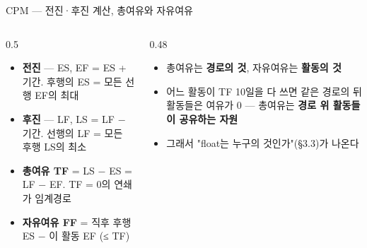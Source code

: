 \begin{frame}{CPM — 전진·후진 계산, 총여유와 자유여유}
\begin{columns}[T]
\begin{column}{0.5\textwidth}
\begin{itemize}
\item \textbf{전진} — ES, EF = ES + 기간. 후행의 ES = 모든 선행 EF의 최대
\item \textbf{후진} — LF, LS = LF $-$ 기간. 선행의 LF = 모든 후행 LS의 최소
\item \textbf{총여유 TF} = LS $-$ ES = LF $-$ EF. TF = 0의 연쇄가 임계경로
\item \textbf{자유여유 FF} = 직후 후행 ES $-$ 이 활동 EF (≤ TF)
\end{itemize}
\end{column}
\begin{column}{0.48\textwidth}
\begin{itemize}
\item 총여유는 \textbf{경로의 것}, 자유여유는 \textbf{활동의 것}
\item 어느 활동이 TF 10일을 다 쓰면 같은 경로의 뒤 활동들은 여유가 0 — 총여유는 \textbf{경로 위 활동들이 공유하는 자원}
\item 그래서 "float는 누구의 것인가"(§3.3)가 나온다
\end{itemize}
\end{column}
\end{columns}
\end{frame}

